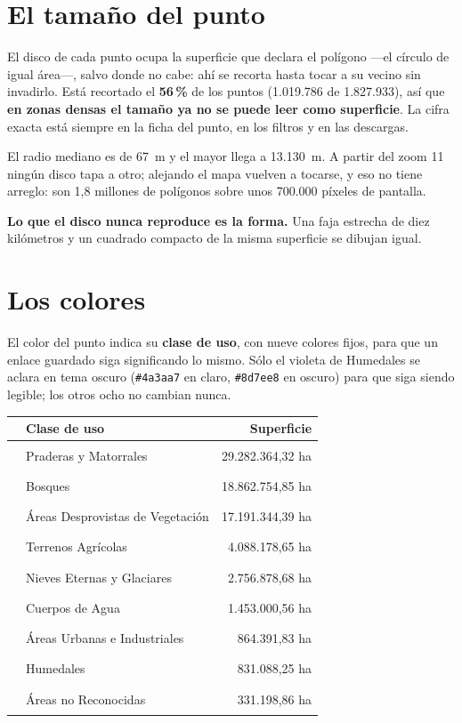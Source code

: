 \documentclass[11pt,a4paper]{report}
\newcommand{\campo}[1]{\textcolor{conaf}{\textbf{#1}}}
\newcommand{\orig}[1]{\texttt{\small #1}}
\begin{document}
\section{El tamaño del punto}

El disco de cada punto ocupa la superficie que declara el polígono —el círculo
de igual área—, salvo donde no cabe: ahí se recorta hasta tocar a su vecino sin
invadirlo. Está recortado el \textbf{56\,\%} de los puntos (1.019.786 de
1.827.933), así que \campo{en zonas densas el tamaño ya no se puede leer como
superficie}. La cifra exacta está siempre en la ficha del punto, en los filtros
y en las descargas.

El radio mediano es de 67~m y el mayor llega a 13.130~m. A partir del zoom 11
ningún disco tapa a otro; alejando el mapa vuelven a tocarse, y eso no tiene
arreglo: son 1,8 millones de polígonos sobre unos 700.000 píxeles de pantalla.

\begin{nota}
\campo{Lo que el disco nunca reproduce es la forma.} Una faja estrecha de diez
kilómetros y un cuadrado compacto de la misma superficie se dibujan igual.
\end{nota}

\section{Los colores}

El color del punto indica su \campo{clase de uso}, con nueve colores fijos, para
que un enlace guardado siga significando lo mismo. Sólo el violeta de Humedales
se aclara en tema oscuro (\orig{\#4a3aa7} en claro, \orig{\#8d7ee8} en oscuro)
para que siga siendo legible; los otros ocho no cambian nunca.

\begin{center}
\begin{tabular}{@{}cl r@{}}
\toprule
& \textbf{Clase de uso} & \textbf{Superficie}\\
\midrule
\textcolor[HTML]{1baf7a}{\rule{3.2mm}{3.2mm}} & Praderas y Matorrales & 29.282.364,32 ha\\
\textcolor[HTML]{008300}{\rule{3.2mm}{3.2mm}} & Bosques & 18.862.754,85 ha\\
\textcolor[HTML]{eb6834}{\rule{3.2mm}{3.2mm}} & Áreas Desprovistas de Vegetación & 17.191.344,39 ha\\
\textcolor[HTML]{eda100}{\rule{3.2mm}{3.2mm}} & Terrenos Agrícolas & 4.088.178,65 ha\\
\textcolor[HTML]{2fb6dc}{\rule{3.2mm}{3.2mm}} & Nieves Eternas y Glaciares & 2.756.878,68 ha\\
\textcolor[HTML]{2a78d6}{\rule{3.2mm}{3.2mm}} & Cuerpos de Agua & 1.453.000,56 ha\\
\textcolor[HTML]{e34948}{\rule{3.2mm}{3.2mm}} & Áreas Urbanas e Industriales & 864.391,83 ha\\
\textcolor[HTML]{4a3aa7}{\rule{3.2mm}{3.2mm}} & Humedales & 831.088,25 ha\\
\textcolor[HTML]{e87ba4}{\rule{3.2mm}{3.2mm}} & Áreas no Reconocidas & 331.198,86 ha\\
\bottomrule
\end{tabular}
\end{center}
\end{document}
